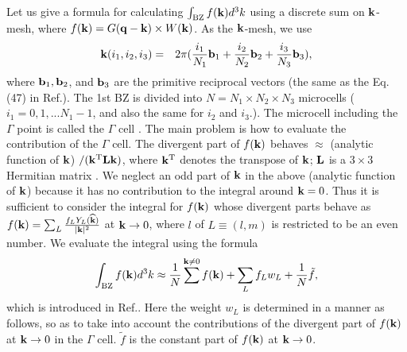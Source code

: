 \documentclass[a4paper,10pt,epsf,fleqn]{article}
\newcommand{\bfq}{{\bf q}}
\newcommand{\bfk}{{\bf k}}
\begin{document}
Let us give a formula for calculating
$\int_{\rm BZ} f(\bfk) d^3k$ using a discrete sum on $\bfk$-mesh,
where $f(\bfk)=G(\bfq-\bfk) \times W(\bfk)$.
As the $\bfk$-mesh, we use
\begin{eqnarray}
{\bf k}(i_1,i_2,i_3) &=& 2 \pi (\frac{i_1}{N_1} {\bf b}_1 
+ \frac{i_2}{N_2} {\bf b}_2 + \frac{i_3}{N_3} {\bf b}_3),
\label{kmesh}
\nonumber
\end{eqnarray}
where ${\bf b}_1, {\bf b}_2$, and ${\bf b}_3$ are the primitive reciprocal
vectors (the same as the Eq.(47) in Ref.\cite{kotani_quasiparticle_2007}). 
The 1st BZ is divided into $N=N_1 \times N_2 \times N_3$
microcells ($i_1=0,1,... N_1-1$, and also the same for $i_2$ and $i_3$.).
The microcell including the $\Gamma$ point is called the
$\Gamma$ cell \cite{freysoldt_dielectric_2007}.
The main problem is how to evaluate the contribution of the $\Gamma$ cell.
The divergent part of $f(\bfk)$ behaves $\approx$ (analytic function of $\bfk$) 
$/(\bfk^{\rm T}{\bf L}\bfk)$, 
where $\bfk^{\rm T}$ denotes the transpose of $\bfk$; ${\bf L}$
is a $3\times3$ Hermitian matrix \cite{friedrich_efficient_2010}. 
We neglect an odd part of $\bfk$ in the above (analytic function of $\bfk$)
because it has no contribution to the integral around $\bfk=0$.
Thus it is sufficient to consider the integral for $f(\bfk)$ whose divergent parts behave
as $f(\bfk)=\sum_L \frac{f_L Y_L(\widehat{\bfk})}{|\bfk|^2}$ at $\bfk \to 0$, 
where $l$ of $L\equiv(l,m)$ is restricted to be an even number.
We evaluate the integral using the formula
\begin{eqnarray}
\int_{\rm BZ} f(\bfk) d^3k \approx \frac{1}{N}\sum^{\bfk \ne 0} f(\bfk)
 + \sum_L f_L w_L + \frac{1}{N} \tilde{f},
\label{eq:bzint0}
\end{eqnarray}
which is introduced in Ref.\cite{freysoldt_dielectric_2007}. 
Here the weight $w_L$ is determined in a manner as follows,
so as to take into account the contributions of the divergent part of $f(\bfk)$
at $\bfk \to 0$ in the $\Gamma$ cell.
$\tilde{f}$ is the constant part of $f(\bfk)$ at $\bfk \to 0$.
\end{document}
